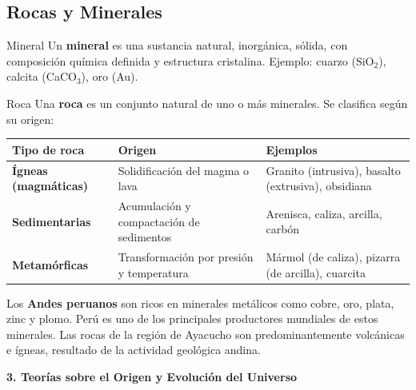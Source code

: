 \documentclass[11pt]{article}
\newcommand{\seccion}[2]{%
	\begin{tcolorbox}[colback=#1, colframe=#1, arc=4pt,
		left=8pt, right=8pt, top=4pt, bottom=4pt,
		before skip=12pt, after skip=6pt]
		\textbf{\large\color{white} #2}
	\end{tcolorbox}%
}
\begin{document}
	\subsection{Rocas y Minerales}
	\begin{defbox}{Mineral}
		Un \textbf{mineral} es una sustancia natural, inorg\'anica, s\'olida, con composici\'on qu\'imica definida y estructura cristalina. Ejemplo: cuarzo (SiO$_2$), calcita (CaCO$_3$), oro (Au).
	\end{defbox}
	\begin{defbox}{Roca}
		Una \textbf{roca} es un conjunto natural de uno o m\'as minerales. Se clasifica seg\'un su origen:
	\end{defbox}
	\begin{center}
		\begin{tabular}{>{\bfseries}p{2.8cm} p{4.5cm} p{4.5cm}}
			\toprule
			Tipo de roca & Origen & Ejemplos \\
			\midrule
			\'Igneas (magm\'aticas) & Solidificaci\'on del magma o lava & Granito (intrusiva), basalto (extrusiva), obsidiana \\[4pt]
			Sedimentarias & Acumulaci\'on y compactaci\'on de sedimentos & Arenisca, caliza, arcilla, carb\'on \\[4pt]
			Metamórficas & Transformaci\'on por presi\'on y temperatura & M\'armol (de caliza), pizarra (de arcilla), cuarcita \\
			\bottomrule
		\end{tabular}
	\end{center}
	\begin{curiosbox}
		Los \textbf{Andes peruanos} son ricos en minerales met\'alicos como cobre, oro, plata, zinc y plomo. Per\'u es uno de los principales productores mundiales de estos minerales. Las rocas de la regi\'on de Ayacucho son predominantemente volc\'anicas e \'igneas, resultado de la actividad geol\'ogica andina.
	\end{curiosbox}
	\seccion{morado}{3. Teorías sobre el Origen y Evolución del Universo}
\end{document}
